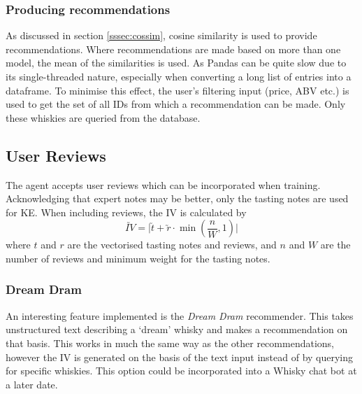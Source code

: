 \subsubsection{Producing recommendations}
As discussed in section \ref{sssec:cossim}, cosine similarity is used to provide recommendations.
Where recommendations are made based on more than one model, the mean of the similarities is used.
As Pandas can be quite slow due to its single-threaded nature, especially
when converting a long list of entries into a dataframe. To minimise this effect, the user's filtering input 
(price, ABV etc.) is used to get the set of all IDs from which a recommendation can be made.
Only these whiskies are queried from the database.

\subsection{User Reviews}
The agent accepts user reviews which can be incorporated when training. Acknowledging that expert notes may be better,
only the tasting notes are used for KE. When including reviews, the IV is calculated by
\begin{equation}\label{eqn:revweight}
    \utilde{IV} = \vert \utilde{t} + \utilde{r} \cdot \min(\frac{n}{W}, 1) \vert 
\end{equation}
where $t$ and $r$ are the vectorised tasting notes and reviews, and $n$ and $W$ are the number of reviews and minimum weight 
for the tasting notes.

\subsubsection{Dream Dram}
An interesting feature implemented is the \emph{Dream Dram} recommender.  This takes unstructured text describing
a `dream' whisky and makes a recommendation on that basis. This works in much the same way as the other recommendations, 
however the IV is generated on the basis of the text input instead of by querying for specific whiskies. This option 
could be incorporated into a Whisky chat bot at a later date.
